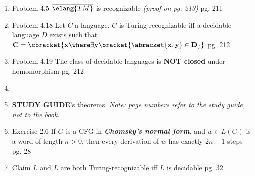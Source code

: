 \documentclass[12pt]{article} %
\newcommand{\theoremitem}[3]{\item #1 \quad #2 \dotfill #3}
\newenvironment{theoremlist} {
    \begin{enumerate}[nosep,leftmargin=*,label={}]
} {
    \end{enumerate}
}
\begin{document}
\begin{theoremlist}
    \theoremitem{Problem 4.5}
    {$\overline{\elang{TM}}$ is recognizable \textit{(proof on pg. 213)}}
    {pg. 211}
    \theoremitem{Problem 4.18}
    {Let $C$ a language. $C$ is Turing-recognizable iff a decidable language $D$ exists such that
    $\mathbf{C = \cbracket{x \where \exists y \bracket{\abracket{x,y}\in D}}}$}
    {pg. 212}
    \theoremitem{Problem 4.19}
    {The class of decidable languages is \textbf{NOT closed} under homomorphism}
    {pg. 212}
    
    \item[]
    \item[]
    \textbf{STUDY GUIDE}'s theorems. \textit{Note: page numbers refer to the study guide, not to the book.}
    \theoremitem{Exercise 2.6}
    {If $G$ is a CFG in \textit{\textbf{Chomsky's normal form}}, and $w\in L(G)$ is a word of length $n>0$, then every derivation of $w$ has exactly $2n-1$ steps}
    {pg. 28}
    \theoremitem{Claim}
    {$L$ and $\overline{L}$ are both Turing-recognizable iff $L$ is decidable}
    {pg. 32}
\end{theoremlist}
\end{document}
